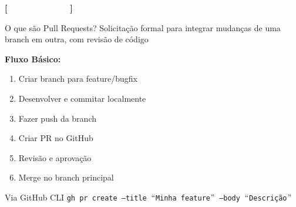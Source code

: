 \documentclass[10pt, brazil]{beamer}
\begin{document}
\begin{frame}{\textcolor{lightpurple}{\textbf{[}} \textbf{\textcolor{white}{Pull Requests}} \textcolor{lightpurple}{\textbf{]}}}
  
  \begin{block}{O que são Pull Requests?}
    Solicitação formal para integrar mudanças de uma branch em outra, com revisão de código
  \end{block}

  \vspace{1em}

  \textbf{Fluxo Básico:}
  \begin{enumerate}
    \item Criar branch para feature/bugfix
    \item Desenvolver e commitar localmente
    \item Fazer push da branch
    \item Criar PR no GitHub
    \item Revisão e aprovação
    \item Merge no branch principal
  \end{enumerate}

  \vspace{1em}

  \begin{block}{Via GitHub CLI}
    \texttt{gh pr create --title $``$Minha feature$"$ --body $``$Descrição$"$}
  \end{block}

\end{frame}
\end{document}
